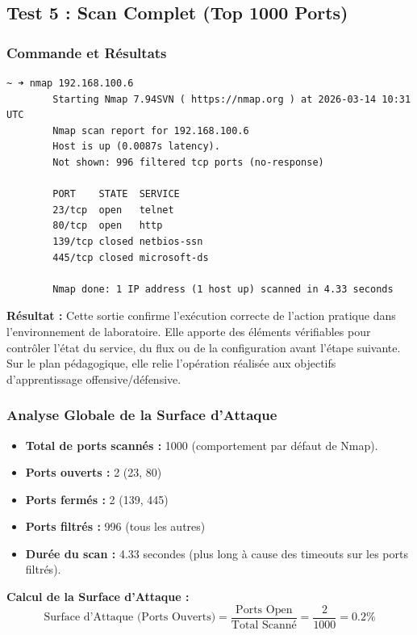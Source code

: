 \documentclass[12pt,a4paper,openany]{report}
\begin{document}
	\subsection{Test 5 : Scan Complet (Top 1000 Ports)}
	\subsubsection{Commande et Résultats}
	\begin{lstlisting}[caption=Scan Nmap des 1000 ports les plus courants]
		~ ➜ nmap 192.168.100.6
		Starting Nmap 7.94SVN ( https://nmap.org ) at 2026-03-14 10:31 UTC
		Nmap scan report for 192.168.100.6
		Host is up (0.0087s latency).
		Not shown: 996 filtered tcp ports (no-response)
		
		PORT    STATE  SERVICE
		23/tcp  open   telnet
		80/tcp  open   http
		139/tcp closed netbios-ssn
		445/tcp closed microsoft-ds
		
		Nmap done: 1 IP address (1 host up) scanned in 4.33 seconds
	\end{lstlisting}
	
	\textbf{Résultat :} Cette sortie confirme l'exécution correcte de l'action pratique dans l'environnement de laboratoire. Elle apporte des éléments vérifiables pour contrôler l'état du service, du flux ou de la configuration avant l'étape suivante. Sur le plan pédagogique, elle relie l'opération réalisée aux objectifs d'apprentissage offensive/défensive.
	
	
	\subsubsection{Analyse Globale de la Surface d'Attaque}
	\begin{itemize}
		\item \textbf{Total de ports scannés :} 1000 (comportement par défaut de Nmap).
		\item \textbf{Ports ouverts :} 2 (23, 80)
		\item \textbf{Ports fermés :} 2 (139, 445)
		\item \textbf{Ports filtrés :} 996 (tous les autres)
		\item \textbf{Durée du scan :} 4.33 secondes (plus long à cause des timeouts sur les ports filtrés).
	\end{itemize}
	
	\textbf{Calcul de la Surface d'Attaque :}
	\[
	\text{Surface d'Attaque (Ports Ouverts)} = \frac{\text{Ports Open}}{\text{Total Scanné}} = \frac{2}{1000} = 0.2\%
	\]
	
\end{document}
